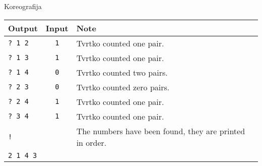 \begin{statement}[
  problempoints=100,
  timelimit=8 seconds,
  memorylimit=1024 MiB,
]{Koreografija}
{\renewcommand{\arraystretch}{1.4}
  \setlength{\tabcolsep}{6pt}
  \begin{tabular}{lcl}
    Output & Input & Note \\ \midrule
    \texttt{\frenchspacing? 1 2} & \texttt{1} & Tvrtko counted one pair.\\
    \texttt{\frenchspacing? 1 3} & \texttt{1} & Tvrtko counted one pair. \\
    \texttt{\frenchspacing? 1 4} & \texttt{0} & Tvrtko counted two pairs. \\
    \texttt{\frenchspacing? 2 3} & \texttt{0} & Tvrtko counted zero pairs. \\
    \texttt{\frenchspacing? 2 4} & \texttt{1} & Tvrtko counted one pair. \\
    \texttt{\frenchspacing? 3 4} & \texttt{1} & Tvrtko counted one pair. \\
    \texttt{\frenchspacing!} & & The numbers have been found, they are printed in order. \\
    \texttt{2 1 4 3} & & \\
\end{tabular}}


\end{statement}


